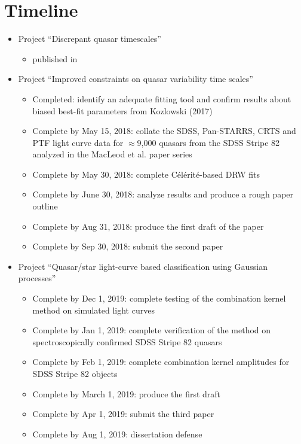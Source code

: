 \documentclass[modern]{aastex62}
\begin{document}
\section{Timeline}
\begin{itemize}
    \item Project ``Discrepant quasar timescales''
     \begin{itemize}
     	\item published in \cite{suberlak2017}
     \end{itemize}

    \item Project ``Improved constraints on quasar variability time scales''
    \begin{itemize}
        \item Completed: identify an adequate fitting tool and confirm results about biased
  best-fit parameters from Kozlowski (2017)
        \item Complete by May 15, 2018: collate the SDSS, Pan-STARRS, CRTS and PTF
  light curve data for $\approx$9,000 quasars from the SDSS Stripe 82 analyzed in 
  the MacLeod et al. paper series
        \item Complete by May 30, 2018: complete C\'el\'erit\'e-based DRW fits
        \item Complete by June 30, 2018: analyze results and produce a rough paper outline
        \item Complete by Aug 31, 2018: produce the first draft of the paper  
        \item Complete by Sep 30, 2018: submit the second paper  
     \end{itemize}
    \item Project ``Quasar/star light-curve based classification using Gaussian processes''
    \begin{itemize}
    	\item Complete by Dec 1, 2019: complete testing of the combination kernel method on simulated light curves 
    	\item Complete by Jan 1, 2019: complete verification of the method on spectroscopically confirmed SDSS Stripe 82 quasars
    	\item Complete by Feb 1, 2019: complete combination kernel amplitudes for SDSS Stripe 82 objects
    	\item Complete by March 1, 2019: produce the first draft
    	\item Complete by Apr 1, 2019: submit the third paper 
    	\item Complete by Aug 1, 2019: dissertation defense 
    \end{itemize}

 \end{itemize}




\end{document}
